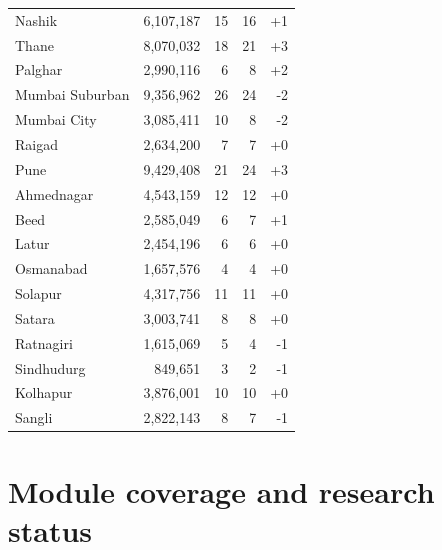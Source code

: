 \documentclass[11pt,a4paper,oneside]{report}
\begin{document}
\begin{center}
\begin{longtable}{lrrrr}
Nashik & 6,107,187 & 15 & 16 & +1\\
Thane & 8,070,032 & 18 & 21 & +3\\
Palghar & 2,990,116 & 6 & 8 & +2\\
Mumbai Suburban & 9,356,962 & 26 & 24 & -2\\
Mumbai City & 3,085,411 & 10 & 8 & -2\\
Raigad & 2,634,200 & 7 & 7 & +0\\
Pune & 9,429,408 & 21 & 24 & +3\\
Ahmednagar & 4,543,159 & 12 & 12 & +0\\
Beed & 2,585,049 & 6 & 7 & +1\\
Latur & 2,454,196 & 6 & 6 & +0\\
Osmanabad & 1,657,576 & 4 & 4 & +0\\
Solapur & 4,317,756 & 11 & 11 & +0\\
Satara & 3,003,741 & 8 & 8 & +0\\
Ratnagiri & 1,615,069 & 5 & 4 & -1\\
Sindhudurg & 849,651 & 3 & 2 & -1\\
Kolhapur & 3,876,001 & 10 & 10 & +0\\
Sangli & 2,822,143 & 8 & 7 & -1\\
\end{longtable}
\end{center}

\chapter{Module coverage and research status}
\end{document}

